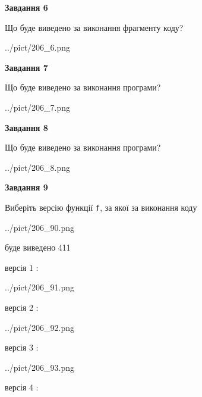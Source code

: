 \documentclass[12pt, ukrainian]{article}
\def\code#1{\Verb!#1!}
\begin{document}
{\begin {large}
{\begin {center}\textbf{Завдання 6}\end {center}}

Що буде виведено за виконання фрагменту коду?\par
\begin{center}
	{../pict/206_6.png}
\end{center}
\newpage

{\begin {center}\textbf{Завдання 7}\end {center}}

Що буде виведено за виконання програми?\par
\begin{center}
	{../pict/206_7.png}
\end{center}
\newpage

{\begin {center}\textbf{Завдання 8}\end {center}}

Що буде виведено за виконання програми?\par
\begin{center}
	{../pict/206_8.png}
\end{center}
\newpage

{\begin {center}\textbf{Завдання 9}\end {center}}

Виберіть версію функції \code{f}, за якої за виконання коду
\begin{center}
	{../pict/206_90.png}
\end{center}
буде виведено 411

\vspace{5mm}
версія 1 :

\begin{center}
	{../pict/206_91.png}
\end{center}
версія 2 :

\begin{center}
	{../pict/206_92.png}
\end{center}
версія 3 :

\begin{center}
	{../pict/206_93.png}
\end{center}
версія 4 :


\end{large}}
\end{document}
